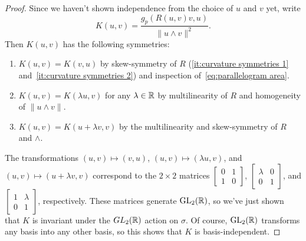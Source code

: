 \begin{proof}
	Since we haven't shown independence from the choice of $u$ and $v$ yet, write
	\[
		K(u,v) = \frac{g_p(R(u,v)v,u)}{\|u \wedge v\|^2}.
	\]
	Then $K(u,v)$ has the following symmetries:
	\begin{enumerate}
		\item $K(u,v) = K(v,u)$ by skew-symmetry of $R$ (\ref{it:curvature symmetries 1} and~\ref{it:curvature symmetries 2}) and inspection of~\eqref{eq:parallelogram area}.
		\item $K(u,v) = K(\lambda u, v)$ for any $\lambda \in \mathbb{R}$ by multilinearity of $R$ and homogeneity of $\|u \wedge v\|$.
		\item $K(u,v) = K(u + \lambda v, v)$ by the multilinearity and skew-symmetry of $R$ and $\wedge$.
	\end{enumerate}
	
	The transformations $(u,v) \mapsto (v,u)$, $(u,v) \mapsto (\lambda u, v)$, and $(u,v) \mapsto (u + \lambda v, v)$ correspond to the $2 \times 2$ matrices $\begin{bmatrix} 0 & 1 \\ 1 & 0 \end{bmatrix}$, $\begin{bmatrix} \lambda & 0 \\ 0 & 1 \end{bmatrix}$, and $\begin{bmatrix} 1 & \lambda \\ 0 & 1 \end{bmatrix}$, respectively. These matrices generate $\operatorname{GL}_2(\mathbb{R})$, so we've just shown that $K$ is invariant under the $GL_2(\mathbb{R})$ action on $\sigma$. Of course, $\operatorname{GL}_2(\mathbb{R})$ transforms any basis into any other basis, so this shows that $K$ is basis-independent.
\end{proof}

